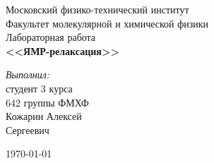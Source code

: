 \begin{titlepage}
\begin{center} 
 
\large Московский физико-технический институт\\
Факультет молекулярной и химической физики\\
\vspace{7cm}
\huge Лабораторная работа\\
\textbf{\Large <<ЯМР-релаксация>>}\\
\end{center} 

\vspace{7.5cm}
{\par \raggedleft \large \emph{Выполнил:}\\ студент 3 курса\\ 642 группы ФМХФ\\ Кожарин Алексей\\ Сергеевич \par}
\begin{center}
\vfill \today
\date \today
\end{center}
\end{titlepage}
\newpage

